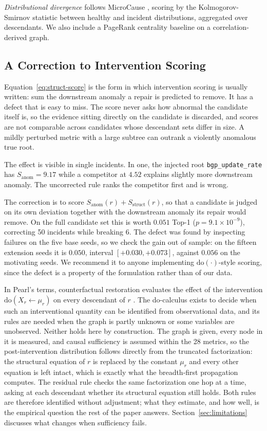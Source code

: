 \documentclass[conference]{IEEEtran}
\begin{document}
\emph{Distributional divergence} follows MicroCause \cite{meng2020microcause}, scoring by the Kolmogorov-Smirnov statistic between healthy and incident distributions, aggregated over descendants. We also include a PageRank centrality baseline on a correlation-derived graph.

\subsection{A Correction to Intervention Scoring}
\label{sec:correction}
Equation~\eqref{eq:struct-score} is the form in which intervention scoring is usually written: sum the downstream anomaly a repair is predicted to remove. It has a defect that is easy to miss. The score never asks how abnormal the candidate itself is, so the evidence sitting directly on the candidate is discarded, and scores are not comparable across candidates whose descendant sets differ in size. A mildly perturbed metric with a large subtree can outrank a violently anomalous true root.

The effect is visible in single incidents. In one, the injected root \texttt{bgp\_update\_rate} has $S_{\mathrm{anom}}=9.17$ while a competitor at $4.52$ explains slightly more downstream anomaly. The uncorrected rule ranks the competitor first and is wrong.

The correction is to score $S_{\mathrm{anom}}(r)+S_{\mathrm{struct}}(r)$, so that a candidate is judged on its own deviation together with the downstream anomaly its repair would remove. On the full candidate set this is worth $0.051$ Top-1 ($p=9.1\times10^{-9}$), correcting 50 incidents while breaking 6. The defect was found by inspecting failures on the five base seeds, so we check the gain out of sample: on the fifteen extension seeds it is $0.050$, interval $[+0.030,+0.073]$, against $0.056$ on the motivating seeds. We recommend it to anyone implementing $\mathrm{do}(\cdot)$-style scoring, since the defect is a property of the formulation rather than of our data.

In Pearl's terms, counterfactual restoration evaluates the effect of the intervention $\mathrm{do}(X_r{\leftarrow}\mu_r)$ on every descendant of $r$ \cite{pearl1995causal,pearl2009causality}. The do-calculus exists to decide when such an interventional quantity can be identified from observational data, and its rules are needed when the graph is partly unknown or some variables are unobserved. Neither holds here by construction. The graph is given, every node in it is measured, and causal sufficiency is assumed within the 28 metrics, so the post-intervention distribution follows directly from the truncated factorization: the structural equation of $r$ is replaced by the constant $\mu_r$ and every other equation is left intact, which is exactly what the breadth-first propagation computes. The residual rule checks the same factorization one hop at a time, asking at each descendant whether its structural equation still holds. Both rules are therefore identified without adjustment; what they estimate, and how well, is the empirical question the rest of the paper answers. Section~\ref{sec:limitations} discusses what changes when sufficiency fails.
\end{document}
